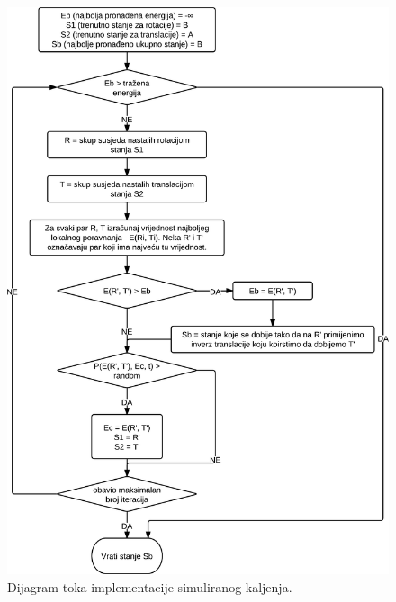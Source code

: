 \documentclass[times, utf8, zavrsni]{fer}
\begin{document}
\begin{figure}
\centering
\includegraphics[scale=1.0]{res/SWIG.png}
\caption[Dijagram toka implementacije simuliranog kaljenja]{Dijagram toka implementacije simuliranog kaljenja. }
\label{figure:flowchart}
\end{figure}
\end{document}
